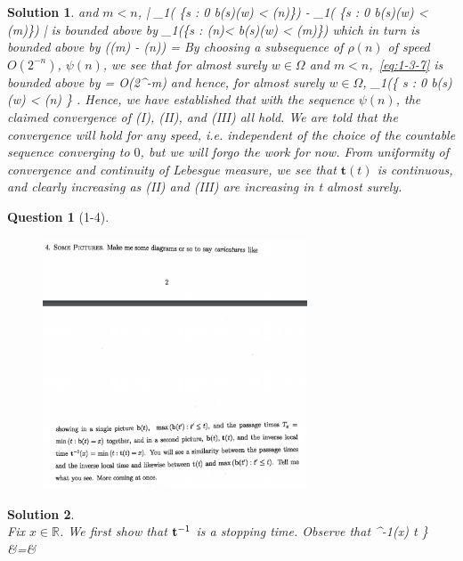 \documentclass[11pt]{article}
\theoremstyle{plain}
\def\eQb#1\eQe{\begin{eqnarray*}#1\end{eqnarray*}}
\def\eQnb#1\eQne{\begin{eqnarray}#1\end{eqnarray}}
\theoremstyle{quest}
\newtheorem*{question}{Question}
\newtheorem*{solution}{Solution}
\begin{document}
\begin{solution}
and $m < n$,  
\eQnb
\left|  
\lambda_1( \{s \in [0,t] : 0 \leq b(s)(w) < \rho(n)\}) -
\lambda_1( \{s \in [0,t] : 0 \leq b(s)(w) < \rho(m)\}) \right| \label{eq:1-3-7} 
\eQne 
is bounded above by
\eQb
\dfrac{1}{2\rho{(m)}}  
\lambda_1(\{s \in [0,t] : \rho(n)< b(s)(w) < \rho(m)\})  
\eQe
which in turn is bounded above by
\eQb
\dfrac{1}{2\rho(m)}  (\rho(m) - \rho(n)) = 
\eQe
By choosing a subsequence of $\rho(n)$ of speed $O(2^{-n})$, $\psi(n)$, we see that
for almost surely $w \in \Omega$ and $m < n$,~\eqref{eq:1-3-7} is bounded above by 
\eQb
\dfrac{\psi(m) - \psi(n)}{\pi \psi(m)}  = O(2^{-m})
\eQe
and hence, for almost surely $w \in \Omega$,
\eQb
\dfrac{1}{2\psi(n)}\lambda_1(\{ s \in [0,t] : 0 \leq b(s)(w) < \psi(n) \} \>\>\>
.
\eQe
Hence, we have established that with the sequence $\psi(n)$, the claimed convergence
of (I), (II), and (III) all hold. We are told that the convergence will hold for any 
speed, i.e. independent of the choice of the countable sequence converging to $0$,
but we will forgo the work for now.
From uniformity of convergence and continuity of Lebesgue measure, we see that
$\textbf{t}(t)$ is continuous, and clearly increasing as (II) and (III) are
increasing in t almost surely. 
 
\end{solution}

\newpage

\begin{question}[1-4]
\hfill
\begin{figure}[h!]
  \centering
    \includegraphics[width=0.7\textwidth]{limthm2-f-p4.png}
\end{figure}
\end{question}
\begin{solution} \hfill \\
Fix $x \in \mathbb{R}$.
We first show that $\bold{t}^{-1}$ is a stopping time. Observe that
\eQb
\{ ^{-1}(x) \leq t \} &=&  
\eQe
\end{solution}
\end{document}
